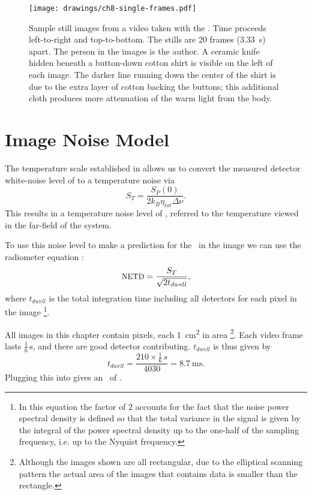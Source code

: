 
\begin{figure}[th]
\centering
\texttt{[image: drawings/ch8-single-frames.pdf]}
\caption{
Sample still images from a video taken with the \Imager.
Time proceeds left-to-right and top-to-bottom.
The stills are 20 frames (\SI{3.33}{\s}) apart.
The person in the images is the author.
A ceramic knife hidden beneath a button-down cotton shirt is visible on the left of each image.
The darker line running down the center of the shirt is due to the extra layer of cotton backing the buttons; this additional cloth produces more attenuation of the warm light from the body.
}
\label{fig:ch8-single-frames}
\end{figure}

\section{Image Noise Model}

The temperature scale established in  allows us to convert the measured detector white-noise level of  to a temperature noise via
\begin{equation}
  S_T = \frac{S_P(0)}{2 k_B \eta_{tot} \Delta \nu}.
\end{equation}
This results in a temperature noise level of , referred to the temperature viewed in the far-field of the system.

To use this noise level to make a prediction for the \NETD\ in the image we can use the radiometer equation \cite{kraus_radio_1986}:
\begin{equation} \label{eqn:ch8-radiometer}
  \text{{\small NETD}} = \frac{S_T}{\sqrt{2 t_{dwell}}},
\end{equation}
where $t_{dwell}$ is the total integration time including all detectors for each pixel in the image%
\footnote{%
In this equation the factor of 2 accounts for the fact that the noise power spectral density is defined so that the total variance in the signal is given by the integral of the power spectral density up to the one-half of the sampling frequency, i.e. up to the Nyquist frequency.
}.

All images in this chapter contain  pixels, each \SI{1}{\cm^2} in area%
\footnote{
  Although the images shown are all rectangular, due to the elliptical scanning pattern the actual area of the images that contains data is smaller than the rectangle.
}.
Each video frame lasts $\frac{1}{6}$\,\si{\s}, and there are  good detector contributing.
$t_{dwell}$ is thus given by
\begin{equation} \label{eqn:ch8-t-dwell}
  t_{dwell} = \frac{210 \times \frac{1}{6}\,\si{s}}{4030} = \SI{8.7}{\ms}.
\end{equation}
Plugging this into  gives an \NETD\ of .

